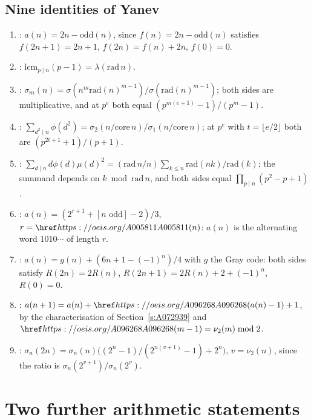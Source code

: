 \subsection{Nine identities of Yanev}\label{s:yanev}
\begin{enumerate}
\item {}: $a(n)=2n-\mathrm{odd}(n)$, since $f(n)=2n-\mathrm{odd}(n)$ satisfies $f(2n+1)=2n+1$,
  $f(2n)=f(n)+2n$, $f(0)=0$.
\item {}: $\mathrm{lcm}_{p\mid n}(p-1)=\lambda(\mathrm{rad}\,n)$.
\item {}: $\sigma_m(n)=\sigma(n^m\mathrm{rad}(n)^{m-1})/\sigma(\mathrm{rad}(n)^{m-1})$; both sides are
  multiplicative, and at $p^e$ both equal $(p^{m(e+1)}-1)/(p^m-1)$.
\item {}: $\sum_{d^2\mid n}\phi(d^2)=\sigma_2(n/\mathrm{core}\,n)/\sigma_1(n/\mathrm{core}\,n)$; at $p^e$ with
  $t=\lfloor e/2\rfloor$ both are $(p^{2t+1}+1)/(p+1)$.
\item {}: $\sum_{d\mid n}d\phi(d)\mu(d)^2=(\mathrm{rad}\,n/n)\sum_{k\le n}\mathrm{rad}(nk)/\mathrm{rad}(k)$; the
  summand depends on $k\bmod\mathrm{rad}\,n$, and both sides equal $\prod_{p\mid n}(p^2-p+1)$.
\item {}: $a(n)=(2^{r+1}+[n\text{ odd}]-2)/3$, $r=\oeis{A005811}(n)$: $a(n)$ is the alternating word
  $1010\cdots$ of length $r$.
\item {}: $a(n)=g(n)+(6n+1-(-1)^n)/4$ with $g$ the Gray code: both sides satisfy $R(2n)=2R(n)$,
  $R(2n+1)=2R(n)+2+(-1)^n$, $R(0)=0$.
\item {}: $a(n+1)=a(n)+\oeis{A096268}(a(n)-1)+1$, by the characterisation of Section~\ref{s:A072939}
  and $\oeis{A096268}(m-1)=\nu_2(m)\bmod2$.
\item {}: $\sigma_n(2n)=\sigma_n(n)\bigl((2^n-1)/(2^{n(v+1)}-1)+2^n\bigr)$, $v=\nu_2(n)$, since the ratio is
  $\sigma_n(2^{v+1})/\sigma_n(2^v)$.
\end{enumerate}

\section{Two further arithmetic statements}\label{s:late}
